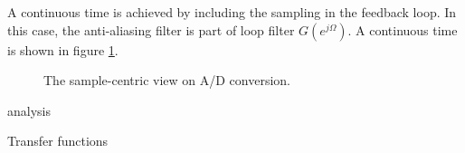 A continuous time \sdmod is achieved by including the sampling in the feedback loop. In this case, the anti-aliasing filter is part of loop filter $G(e^{j\Omega})$. A continuous time \sdmod is shown in figure \ref{fig:ctsdmod}.

\begin{figure}[htbp]
    
    \centering
    \caption{The sample-centric view on A/D conversion.}
    \label{fig:ctsdmod}
\end{figure}

\sdmod analysis


Transfer functions

